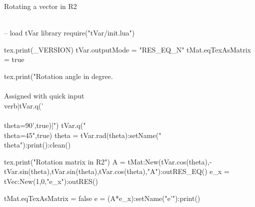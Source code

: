 \documentclass{article}
\begin{document}
Rotating a vector in R2 \\\\
\begin{luacode}
	-- load tVar library
	require("tVar/init.lua")
	
	tex.print(_VERSION)
	tVar.outputMode = "RES_EQ_N"
	tMat.eqTexAsMatrix = true
	
	tex.print("Rotation angle in degree.\\\\ Assigned with quick input \\verb|tVar.q('\\\\theta=90',true)|")
	tVar.q("\\theta=45",true)
	theta = tVar.rad(theta):setName("\\theta"):print():clean()
	
	tex.print("Rotation matrix in R2")
	A = tMat:New({{tVar.cos(theta),-tVar.sin(theta)},{tVar.sin(theta),tVar.cos(theta)}},"A"):outRES_EQ()
	e_x = tVec:New({1,0},"e_x"):outRES()
	
	
	tMat.eqTexAsMatrix = false
	e = (A*e_x):setName("e'"):print()
\end{luacode}
\end{document}
